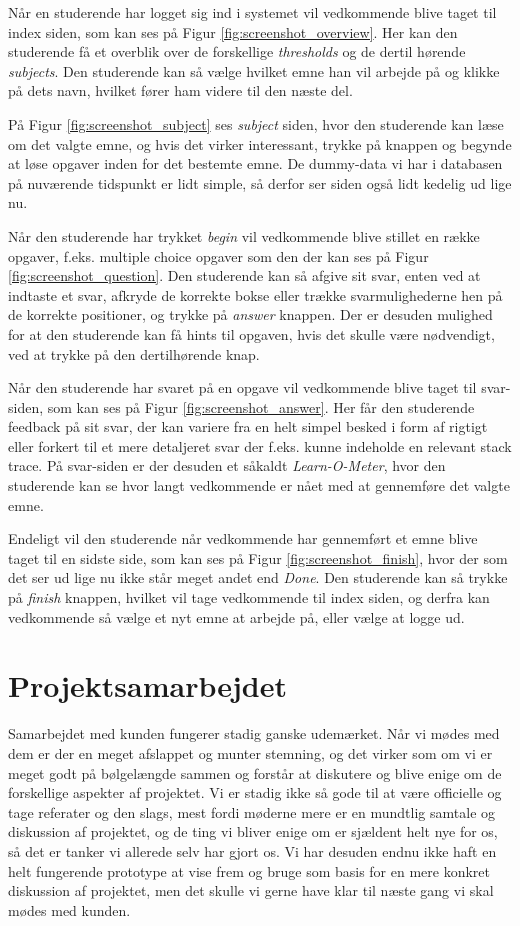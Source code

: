 \documentclass[11pt, a4paper]{article}
\begin{document}
Når en studerende har logget sig ind i systemet vil vedkommende blive taget til index siden, som kan ses på Figur \ref{fig:screenshot_overview}. Her kan den studerende få et overblik over de forskellige \emph{thresholds} og de dertil hørende \emph{subjects}. Den studerende kan så vælge hvilket emne han vil arbejde på og klikke på dets navn, hvilket fører ham videre til den næste del.

På Figur \ref{fig:screenshot_subject} ses \emph{subject} siden, hvor den studerende kan læse om det valgte emne, og hvis det virker interessant, trykke på knappen og begynde at løse opgaver inden for det bestemte emne. De dummy-data vi har i databasen på nuværende tidspunkt er lidt simple, så derfor ser siden også lidt kedelig ud lige nu.

Når den studerende har trykket \emph{begin} vil vedkommende blive stillet en række opgaver, f.eks. multiple choice opgaver som den der kan ses på Figur \ref{fig:screenshot_question}. Den studerende kan så afgive sit svar, enten ved at indtaste et svar, afkryde de korrekte bokse eller trække svarmulighederne hen på de korrekte positioner, og trykke på \emph{answer} knappen. Der er desuden mulighed for at den studerende kan få hints til opgaven, hvis det skulle være nødvendigt, ved at trykke på den dertilhørende knap.

Når den studerende har svaret på en opgave vil vedkommende blive taget til svar-siden, som kan ses på Figur \ref{fig:screenshot_answer}. Her får den studerende feedback på sit svar, der kan variere fra en helt simpel besked i form af rigtigt eller forkert til et mere detaljeret svar der f.eks. kunne indeholde en relevant stack trace. På svar-siden er der desuden et såkaldt \emph{Learn-O-Meter}, hvor den studerende kan se hvor langt vedkommende er nået med at gennemføre det valgte emne.

Endeligt vil den studerende når vedkommende har gennemført et emne blive taget til en sidste side, som kan ses på Figur \ref{fig:screenshot_finish}, hvor der som det ser ud lige nu ikke står meget andet end \emph{Done}. Den studerende kan så trykke på \emph{finish} knappen, hvilket vil tage vedkommende til index siden, og derfra kan vedkommende så vælge et nyt emne at arbejde på, eller vælge at logge ud.

\section{Projektsamarbejdet}
\label{sec:projektsamarbejdet}
Samarbejdet med kunden fungerer stadig ganske udemærket. Når vi mødes med dem er der en meget afslappet og munter stemning, og det virker som om vi er meget godt på bølgelængde sammen og forstår at diskutere og blive enige om de forskellige aspekter af projektet. Vi er stadig ikke så gode til at være officielle og tage referater og den slags, mest fordi møderne mere er en mundtlig samtale og diskussion af projektet, og de ting vi bliver enige om er sjældent helt nye for os, så det er tanker vi allerede selv har gjort os. Vi har desuden endnu ikke haft en helt fungerende prototype at vise frem og bruge som basis for en mere konkret diskussion af projektet, men det skulle vi gerne have klar til næste gang vi skal mødes med kunden. 
\end{document}
